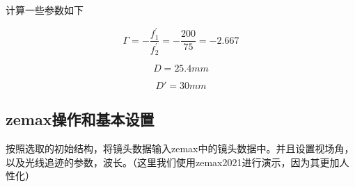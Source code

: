 \documentclass{article}
\begin{document}
计算一些参数如下
\begin{description}[leftmargin=1.7cm,style=nextline,nosep]%
  \item[视觉放大倍率] \[\Gamma=- \frac{f_1^{\prime}}{f_2^{\prime}}=-\frac{200}{75}=-2.667  \tag{1.2}\] 
  \item[镜筒长度 $\thickapprox=f+f'=275mm$]
  \item[入瞳直径$D$]
  \[D=25.4 mm \tag{1.3}\]
  \item[出瞳直径$D'$] \[D'=30 mm\tag{1.4}\]
\end{description}
\subsection{zemax操作和基本设置}
按照选取的初始结构，将镜头数据输入zemax中的镜头数据中。并且设置视场角，以及光线追迹的参数，波长。（这里我们使用zemax2021进行演示，因为其更加人性化）
\end{document}
